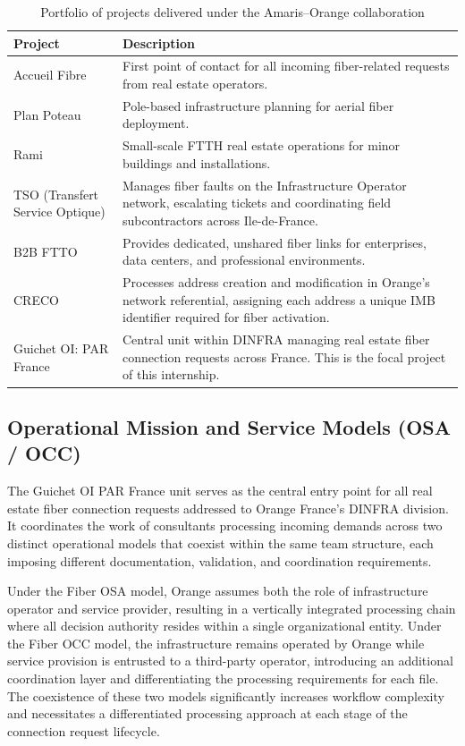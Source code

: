 \begin{table}[H]
  \centering
  \caption{Portfolio of projects delivered under the Amaris--Orange collaboration}
  \renewcommand{\arraystretch}{1.0}
  \begin{tabularx}{\textwidth}{|X|X|}
    \hline
    \textbf{Project} & \textbf{Description} \\ \hline
    Accueil Fibre & First point of contact for all incoming fiber-related requests from real estate operators. \\ \hline
    Plan Poteau & Pole-based infrastructure planning for aerial fiber deployment. \\ \hline
    Rami & Small-scale FTTH real estate operations for minor buildings and installations. \\ \hline
    TSO (Transfert Service Optique) & Manages fiber faults on the Infrastructure Operator network, escalating tickets and coordinating field subcontractors across Ile-de-France. \\ \hline
    B2B FTTO & Provides dedicated, unshared fiber links for enterprises, data centers, and professional environments. \\ \hline
    CRECO & Processes address creation and modification in Orange's network referential, assigning each address a unique IMB identifier required for fiber activation. \\ \hline
    Guichet OI: PAR France & Central unit within DINFRA managing real estate fiber connection requests across France. This is the focal project of this internship. \\ \hline
  \end{tabularx}
\end{table}

\subsection{Operational Mission and Service Models (OSA / OCC)}

The Guichet OI PAR France unit serves as the central entry point for all real estate fiber connection requests addressed to Orange France's DINFRA division. It coordinates the work of consultants processing incoming demands across two distinct operational models that coexist within the same team structure, each imposing different documentation, validation, and coordination requirements.

Under the Fiber OSA model, Orange assumes both the role of infrastructure operator and service provider, resulting in a vertically integrated processing chain where all decision authority resides within a single organizational entity. Under the Fiber OCC model, the infrastructure remains operated by Orange while service provision is entrusted to a third-party operator, introducing an additional coordination layer and differentiating the processing requirements for each file. The coexistence of these two models significantly increases workflow complexity and necessitates a differentiated processing approach at each stage of the connection request lifecycle.

